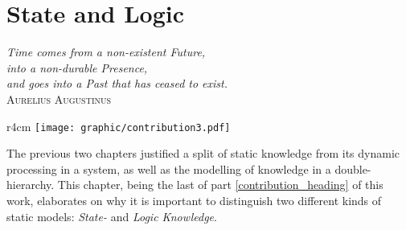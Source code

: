 %
%
%
%
%
%
%

\chapter{State and Logic}
\label{state_and_logic_heading}

\begin{flushright}
    \textsl{
        Time comes from a non-existent Future,\\
        into a non-durable Presence,\\
        and goes into a Past that has ceased to exist.
    }\\
    \textsc{Aurelius Augustinus}
\end{flushright}

\begin{wrapfigure}[6]{r}{4cm}
    \texttt{[image: graphic/contribution3.pdf]}
\end{wrapfigure}

The previous two chapters justified a split of static knowledge from its
dynamic processing in a system, as well as the modelling of knowledge in a
double-hierarchy. This chapter, being the last of part
\ref{contribution_heading} of this work, elaborates on why it is important to
distinguish two different kinds of static models: \emph{State-} and
\emph{Logic Knowledge}.
\vspace{1cm}




